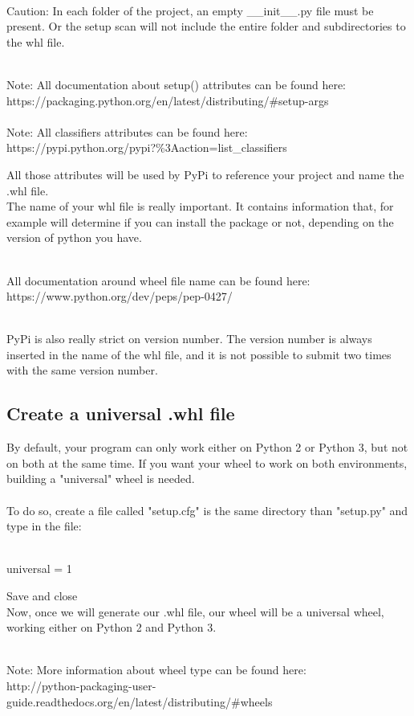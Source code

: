 \documentclass[10pt,letterpaper]{article}
\begin{document}
\begin{bfseries}
\\\color{red}Caution: In each folder of the project, an empty  \_\_init\_\_.py file must be present. Or the setup scan will not include the entire folder and subdirectories to the whl file.\\
\end{bfseries}
\begin{itshape}
\\Note: All documentation about setup() attributes can be found here:\\ https://packaging.python.org/en/latest/distributing/\#setup-args\\
\\Note: All classifiers attributes can be found here:\\
https://pypi.python.org/pypi?\%3Aaction=list\_classifiers\\
\end{itshape}
All those attributes will be used by PyPi to reference your project and name the .whl file.\\
The name of your whl file is really important. It contains information that, for example will determine if you can install the package or not, depending on the version of python you have.\\
\begin{itshape}
\\All documentation around wheel file name can be found here:\\
https://www.python.org/dev/peps/pep-0427/\\
\end{itshape}
\\PyPi is also really strict on version number. The version number is always inserted in the name of the whl file, and it is not possible to submit two times with the same version number.
\subsection {Create a universal .whl file}
By default, your program can only work either on Python 2 or Python 3, but not on both at the same time. If you want your wheel to work on both environments, building a "universal" wheel is needed.\\
\\To do so, create a file called "setup.cfg" is the same directory than "setup.py"
and type in the file:
\begin{mdframed}\\
universal = 1
\end{mdframed}
Save and close\\
Now, once we will generate our .whl file, our wheel will be a universal wheel, working either on Python 2 and Python 3.\\
\begin{itshape}
\\Note: More information about wheel type can be found here:\\
http://python-packaging-user-guide.readthedocs.org/en/latest/distributing/\#wheels
\end{itshape}
\end{document}
